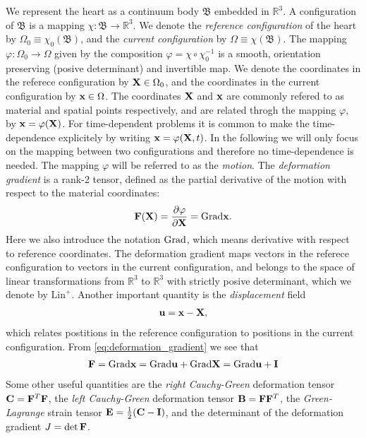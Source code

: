 We represent the heart as a continuum body $\mathfrak{B}$ embedded in
$\mathbb{R}^3$. A configuration of $\mathfrak{B}$ is a mapping $\chi:
\mathfrak{B} \rightarrow \mathbb{R}^3$. 
We denote the \emph{reference configuration} of the heart by $\Omega_0
\equiv \chi_0(\mathfrak{B})$, and the \emph{current configuration} by $\Omega
\equiv \chi(\mathfrak{B})$. The mapping $\varphi :  \Omega_0
\rightarrow \Omega$ given by the composition $\varphi = \chi
\circ \chi_0^{-1}$ is a smooth, orientation preserving (posive
determinant) and invertible map. We denote the coordinates in the
referece configuration by $\mathbf{X} \in \Omega_0$, and the coordinates in the current
configuration by $\mathbf{x} \in \Omega$. The coordinates $\mathbf{X}$ and $\mathbf{x}$ are
commonly refered to as material and spatial points respectively, and
are related throgh the mapping $\varphi$, by $\mathbf{x} = \varphi(\mathbf{X})$.
For time-dependent problems it is common to make  the time-dependence
explicitely by writing $\mathbf{x} = \varphi(\mathbf{X}, t)$. In the following
we will only focus on the mapping between two configurations and
therefore no time-dependence is needed. The mapping $\varphi$ will be
referred to as the \emph{motion}. The \emph{deformation gradient} is a
rank-2 tensor, defined as the partial derivative of the motion with
respect to the material coordinates:
\begin{align}
  \mathbf{F}(\mathbf{X}) = \frac{\partial \varphi}{\partial \mathbf{X}} = \mathrm{Grad} \mathbf{x}.
  \label{eq:deformation_gradient}
\end{align}
Here we also introduce the notation $\mathrm{Grad}$, which means derivative
with respect to reference coordinates.
The deformation gradient maps vectors in the referece configuration to
vectors in the current configuration, and belongs to the space of
linear transformations from $\mathbb{R}^3$ to $\mathbb{R}^3$ with
strictly posive determinant, which we denote by
$\mathrm{Lin}^+$. Another important quantity is the
\emph{displacement} field  
\begin{align}
  \mathbf{u} = \mathbf{x}-\mathbf{X}, 
  \label{eq:displacement}
\end{align}
which relates postitions in the reference configuration to positions
in the current configuration. From \eqref{eq:deformation_gradient} we
see that
\begin{align}
  \mathbf{F} = \mathrm{Grad} \mathbf{x} = \mathrm{Grad} \mathbf{u} + \mathrm{Grad} \mathbf{X} = \mathrm{Grad} \mathbf{u} + \mathbf{I}
\end{align}
Some other useful quantities are the \emph{right Cauchy-Green} deformation
tensor $\mathbf{C} = \mathbf{F}^T\mathbf{F}$, the \emph{left Cauchy-Green} deformation tensor
$\mathbf{B} = \mathbf{F}\mathbf{F}^T$, the \emph{Green-Lagrange} strain tensor
$\mathbf{E} = \frac{1}{2}(\mathbf{C} - \mathbf{I})$, and the determinant of the
deformation gradient $J = \det \mathbf{F}$.

